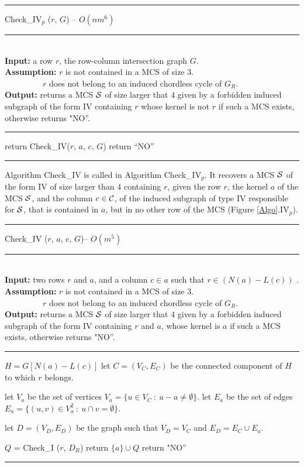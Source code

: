 \documentclass{article}
\begin{document}
\begin{algorithm}[htpb]                      
\rule{11.7cm}{0.01cm}
\caption{Check\_IV$_p$ ($r$, $G$) -- $O(nm^6)$} 
\rule{11.7cm}{0.01cm}
\\
{\bf Input:} a row $r$, the row-column intersection graph $G$.\\
{\bf Assumption:}  $r$ is not contained in a MCS of size $3$.\\
$~~~~~~~~~~~~~~~~~~~~~r$ does not belong to an induced chordless cycle of $G_R$.\\
{\bf Output:} returns a MCS ${\cal S}$ of size larger that $4$ given by a 
forbidden induced subgraph of the form IV containing $r$ whose kernel is 
not $r$ if such a MCS exists, otherwise returns  "NO''.
\rule{11.7cm}{0.01cm}
\begin{algorithmic}[1]                
\STATE return Check\_IV($r$, $a$, $c$, $G$)
\ENDFOR
\ENDFOR
\STATE return ``NO''
\end{algorithmic}
\rule{11.7cm}{0.01cm}
\end{algorithm}

Algorithm \mbox{Check\_IV} is called in Algorithm \mbox{Check\_IV$_p$}. It 
recovers a  MCS ${\cal S}$ of the form IV of size larger 
than $4$ containing $r$, given the row $r$, the  kernel $a$ of 
the MCS ${\cal S}$, and the column $c\in {\cal C}$, of the
induced subgraph of type IV responsible for ${\cal S}$, that is contained 
in $a$, but in no other row of the MCS (Figure \ref{Algo}.IV$_p$).

 \begin{algorithm}[htpb]                      
 \rule{11.7cm}{0.01cm}
 \caption{Check\_IV ($r$, $a$, $c$, $G$)-- $O(m^5)$}
 \rule{11.7cm}{0.01cm}
 \\
 {\bf Input:} two rows $r$ and $a$, and a column $c\in a$ such that
  $r \in (N(a)-L(c))$ .\\
 {\bf Assumption:}  $r$ is not contained in a MCS of size $3$.\\
 $~~~~~~~~~~~~~~~~~~~~~r$ does not belong to an induced chordless cycle of $G_R$.\\
 {\bf Output:} returns a MCS ${\cal S}$ of size larger that $4$ given by a 
 forbidden induced subgraph of the form IV containing $r$ and $a$, whose 
 kernel is $a$ if such a MCS exists, otherwise returns  "NO''.
 \rule{11.7cm}{0.01cm}
 \begin{algorithmic}[1]                
\STATE $H = G[N(a)-L(c)]$
 \STATE let $C=(V_C,E_C)$ be the connected component of $H$ to which $r$ belongs.


 \STATE let $V_a$ be the set of vertices $V_a= \{u\in V_C ~:~ u-a \neq \emptyset\}$.
 \STATE let $E_a$ be the set of edges $E_a= \{(u,v)\in V_a^2 ~:~  u\cap v = \emptyset\}$.

 \STATE let $D=(V_D,E_D)$ be the graph such that $V_D = V_C$ and $E_D=E_C\cup E_a$.

 \STATE $Q$ =  Check\_I ($r$, $D_R$)
 \STATE return $\{a\}\cup Q$
 \ENDIF
 \STATE return "NO''
 \end{algorithmic}
 \rule{11.7cm}{0.01cm}
 \end{algorithm}
\end{document}
